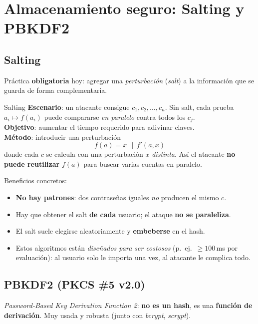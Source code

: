 \documentclass[11pt,a4paper]{article}
\begin{document}
\section{Almacenamiento seguro: Salting y PBKDF2}

\subsection{Salting}
Práctica \textbf{obligatoria} hoy: agregar una \emph{perturbación} (\emph{salt}) a la
información que se guarda de forma complementaria.

\begin{defbox}{Salting}
\textbf{Escenario}: un atacante consigue $c_1, c_2,\dots,c_n$. Sin salt, cada prueba
$a_i\mapsto f(a_i)$ puede compararse \emph{en paralelo} contra todos los $c_j$.\\[4pt]
\textbf{Objetivo}: aumentar el tiempo requerido para adivinar claves.\\[4pt]
\textbf{Método}: introducir una perturbación
\[
  f(a) = x \,\|\, f'(a, x)
\]
donde cada $c$ se calcula con una perturbación $x$ \emph{distinta}. Así el atacante
\textbf{no puede reutilizar} $f(a)$ para buscar varias cuentas en paralelo.
\end{defbox}

Beneficios concretos:
\begin{itemize}[leftmargin=1.4em,itemsep=1pt]
  \item \textbf{No hay patrones}: dos contraseñas iguales \emph{no} producen el mismo $c$.
  \item Hay que obtener el salt \textbf{de cada} usuario; el ataque \textbf{no se
        paraleliza}.
  \item El salt suele elegirse aleatoriamente y \textbf{embeberse} en el hash.
  \item Estos algoritmos están \emph{diseñados para ser costosos} (p.\ ej.\ $\ge100$\,ms por
        evaluación): al usuario solo le importa una vez, al atacante le complica todo.
\end{itemize}

\subsection{PBKDF2 (PKCS \#5 v2.0)}
\emph{Password-Based Key Derivation Function 2}: \textbf{no es un hash}, es una
\textbf{función de derivación}. Muy usada y robusta (junto con \emph{bcrypt}, \emph{scrypt}).
\end{document}
